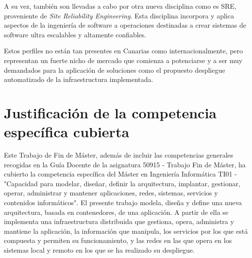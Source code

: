 A su vez, también son llevadas a cabo por otra nueva disciplina como es SRE, proveniente de \textit{Site Reliability Engineering}. Esta disciplina incorpora y aplica aspectos de la ingeniería de software a operaciones destinadas a crear sistemas de software ultra escalables y altamente confiables. 

Estos perfiles no están tan presentes en Canarias como internacionalmente, pero representan un fuerte nicho de mercado que comienza a potenciarse y a ser muy demandados para la aplicación de soluciones como el propuesto despliegue automatizado de la infraestructura implementada.

\section{Justificación de la competencia específica cubierta}

Este Trabajo de Fin de Máster, además de incluir las competencias generales recogidas en la Guía Docente de la asignatura 50915 - Trabajo Fin de Máster, ha cubierto la competencia específica del Máster en Ingeniería Informática TI01 - "Capacidad para modelar, diseñar, definir la arquitectura, implantar, gestionar, operar, administrar y mantener aplicaciones, redes, sistemas, servicios y contenidos informáticos". El presente trabajo modela, diseña y define una nueva arquitectura, basada en contenedores, de una aplicación. A partir de ella se implementa una infraestructura distribuida que gestiona, opera, administra y mantiene la aplicación, la información que manipula, los servicios por los que está compuesta y permiten su funcionamiento, y las redes en las que opera en los sistemas local y remoto en los que se ha realizado su despliegue.


